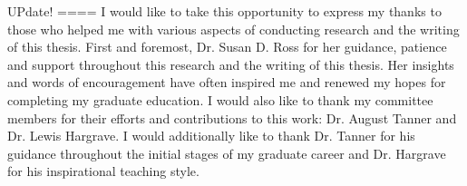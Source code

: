 
UPdate!
====
I would like to take this opportunity to express my thanks to those
who helped me with various aspects of conducting research and the writing
of this thesis.
First and foremost, Dr. Susan D. Ross for her guidance, patience and support
throughout this research and the writing of this thesis.
Her insights and words of encouragement have often inspired me and renewed
my hopes for completing my graduate education.
I would also like to thank my committee members for their efforts
and contributions to this work: Dr. August Tanner and
Dr. Lewis Hargrave.
I would additionally like to thank
Dr. Tanner for his guidance throughout the initial stages of my
graduate career and Dr. Hargrave for his inspirational teaching style.
